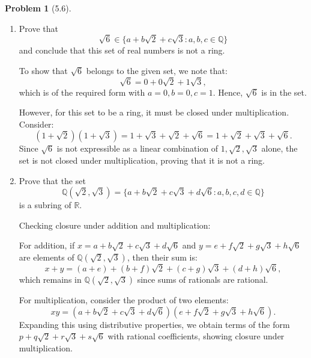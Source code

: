 \documentclass[12pt]{article}
\theoremstyle{definition}
\newtheorem{problem}{Problem}
\begin{document}
\begin{problem}[5.6]
    \phantom{.}
    \begin{enumerate}[label=(\alph*)]
        \item Prove that
              \[
                  \sqrt{6} \in \{ a + b\sqrt{2} + c\sqrt{3} : a, b, c \in \mathbb{Q} \}
              \]
              and conclude that this set of real numbers is not a ring.

              \begin{solution}
                To show that $\sqrt{6}$ belongs to the given set, we note that:
                \[
                    \sqrt{6} = 0 + 0\sqrt{2} + 1\sqrt{3},
                \]
                which is of the required form with $a = 0, b = 0, c = 1$. Hence, $\sqrt{6}$ is in the set.
  
                However, for this set to be a ring, it must be closed under multiplication. Consider:
                \[
                    (1 + \sqrt{2})(1 + \sqrt{3}) = 1 + \sqrt{3} + \sqrt{2} + \sqrt{6} = 1 + \sqrt{2} + \sqrt{3} + \sqrt{6}.
                \]
                Since $\sqrt{6}$ is not expressible as a linear combination of $1, \sqrt{2}, \sqrt{3}$ alone, the set is not closed under multiplication, proving that it is not a ring.  
              \end{solution}

        \item Prove that the set
              \[
                  \mathbb{Q}(\sqrt{2}, \sqrt{3}) = \{ a + b\sqrt{2} + c\sqrt{3} + d\sqrt{6} : a, b, c, d \in \mathbb{Q} \}
              \]
              is a subring of $\mathbb{R}$.

              \begin{solution}
                Checking closure under addition and multiplication:
              
                For addition, if $x = a + b\sqrt{2} + c\sqrt{3} + d\sqrt{6}$ and $y = e + f\sqrt{2} + g\sqrt{3} + h\sqrt{6}$ are elements of $\mathbb{Q}(\sqrt{2}, \sqrt{3})$, then their sum is:
                \[
                    x + y = (a+e) + (b+f)\sqrt{2} + (c+g)\sqrt{3} + (d+h)\sqrt{6},
                \]
                which remains in $\mathbb{Q}(\sqrt{2}, \sqrt{3})$ since sums of rationals are rational.
                
                For multiplication, consider the product of two elements:
                \[
                    xy = (a + b\sqrt{2} + c\sqrt{3} + d\sqrt{6})(e + f\sqrt{2} + g\sqrt{3} + h\sqrt{6}).
                \]
                Expanding this using distributive properties, we obtain terms of the form $p + q\sqrt{2} + r\sqrt{3} + s\sqrt{6}$ with rational coefficients, showing closure under multiplication.
                

\end{solution}
\end{enumerate}
\end{problem}
\end{document}
